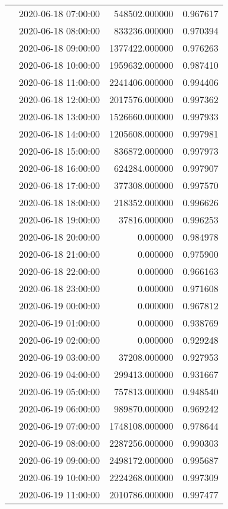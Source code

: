 \begin{tabular}{llrr}
 & 2020-06-18 07:00:00 & 548502.000000 & 0.967617 \\
 & 2020-06-18 08:00:00 & 833236.000000 & 0.970394 \\
 & 2020-06-18 09:00:00 & 1377422.000000 & 0.976263 \\
 & 2020-06-18 10:00:00 & 1959632.000000 & 0.987410 \\
 & 2020-06-18 11:00:00 & 2241406.000000 & 0.994406 \\
 & 2020-06-18 12:00:00 & 2017576.000000 & 0.997362 \\
 & 2020-06-18 13:00:00 & 1526660.000000 & 0.997933 \\
 & 2020-06-18 14:00:00 & 1205608.000000 & 0.997981 \\
 & 2020-06-18 15:00:00 & 836872.000000 & 0.997973 \\
 & 2020-06-18 16:00:00 & 624284.000000 & 0.997907 \\
 & 2020-06-18 17:00:00 & 377308.000000 & 0.997570 \\
 & 2020-06-18 18:00:00 & 218352.000000 & 0.996626 \\
 & 2020-06-18 19:00:00 & 37816.000000 & 0.996253 \\
 & 2020-06-18 20:00:00 & 0.000000 & 0.984978 \\
 & 2020-06-18 21:00:00 & 0.000000 & 0.975900 \\
 & 2020-06-18 22:00:00 & 0.000000 & 0.966163 \\
 & 2020-06-18 23:00:00 & 0.000000 & 0.971608 \\
 & 2020-06-19 00:00:00 & 0.000000 & 0.967812 \\
 & 2020-06-19 01:00:00 & 0.000000 & 0.938769 \\
 & 2020-06-19 02:00:00 & 0.000000 & 0.929248 \\
 & 2020-06-19 03:00:00 & 37208.000000 & 0.927953 \\
 & 2020-06-19 04:00:00 & 299413.000000 & 0.931667 \\
 & 2020-06-19 05:00:00 & 757813.000000 & 0.948540 \\
 & 2020-06-19 06:00:00 & 989870.000000 & 0.969242 \\
 & 2020-06-19 07:00:00 & 1748108.000000 & 0.978644 \\
 & 2020-06-19 08:00:00 & 2287256.000000 & 0.990303 \\
 & 2020-06-19 09:00:00 & 2498172.000000 & 0.995687 \\
 & 2020-06-19 10:00:00 & 2224268.000000 & 0.997309 \\
 & 2020-06-19 11:00:00 & 2010786.000000 & 0.997477 \\

\end{tabular}
